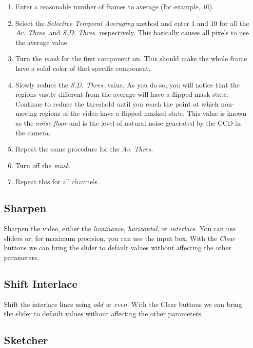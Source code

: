 \begin{enumerate}
    \item Enter a reasonable number of frames to average (for example, $10$).
    \item Select the \textit{Selective Temporal Averaging} method and enter $1$ and $10$ for all the \textit{Av. Thres.} and \textit{S.D. Thres.} respectively. This basically causes all pixels to use the average value.
    \item Turn the \textit{mask} for the first component on. This should make the whole frame have a solid color of that specific component.
    \item Slowly reduce the \textit{S.D. Thres.} value. As you do so, you will notice that the regions vastly different from the average will have a flipped mask state. Continue to reduce the threshold until you reach the point at which non-moving regions of the video have a flipped masked state. This value is known as the \textit{noise-floor} and is the level of natural noise generated by the CCD in the camera.
    \item Repeat the same procedure for the \textit{Av. Thres.}
    \item Turn off the \textit{mask}.
    \item Repeat this for all channels.
\end{enumerate}

\subsection{Sharpen}%
\label{sub:Sharpen}

Sharpen the video, either the \textit{luminance}, \textit{horizontal}, or \textit{interlace}. You can use sliders or, for maximum precision, you can use the input box. With the \textit{Clear} buttons we can bring the slider to default values without affecting the other parameters.

\subsection{Shift Interlace}%
\label{sub:shift_interlace}

Shift the interlace lines using \textit{odd} or \textit{even}. With the Clear buttons we can bring the slider to default values without affecting the other parameters.

\subsection{Sketcher}%
\label{sub:Sketcher}

